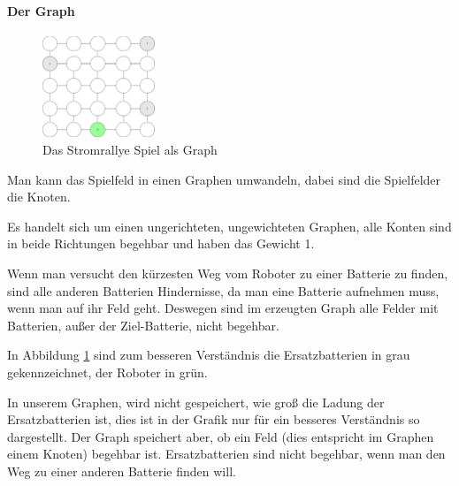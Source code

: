 \documentclass[a4paper,12pt,arial]{scrartcl}
\begin{document}
\paragraph{Der Graph}
\captionsetup[figure]{name=Abb.}
\begin{figure}
    \includegraphics[width=0.3\textwidth]{graph_stromrallye.pdf}
    \caption{Das Stromrallye Spiel als Graph}
    \label{fig:graph_stromrallye}
    \vspace{-5pt}
\end{figure}
\captionsetup[figure]{name=Abbildung}
Man kann das Spielfeld in einen Graphen umwandeln, dabei sind die Spielfelder die Knoten.


Es handelt sich um einen ungerichteten, ungewichteten Graphen, alle Konten sind in beide Richtungen begehbar und haben das Gewicht 1.

Wenn man versucht den kürzesten Weg vom Roboter zu einer Batterie zu finden, sind alle anderen Batterien Hindernisse, da man eine Batterie aufnehmen muss, wenn man auf ihr Feld geht. Deswegen sind im erzeugten Graph alle Felder mit Batterien, außer der Ziel-Batterie, nicht begehbar.

In Abbildung \ref{fig:graph_stromrallye} sind zum besseren Verständnis die Ersatzbatterien in grau gekennzeichnet, der Roboter in grün.

In unserem Graphen, wird nicht gespeichert, wie groß die Ladung der Ersatzbatterien ist, dies ist in der Grafik nur für ein besseres Verständnis so dargestellt.
Der Graph speichert aber, ob ein Feld (dies entspricht im Graphen einem Knoten) begehbar ist. Ersatzbatterien sind nicht begehbar, wenn man den Weg zu einer anderen Batterie finden will.
\end{document}
